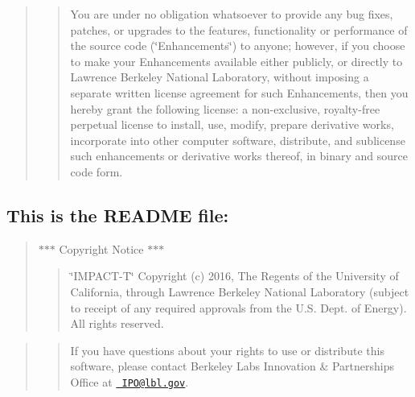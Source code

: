 \begin{quote}
\begin{quote}
You are under no obligation whatsoever to provide any bug fixes, patches, or upgrades to the features, functionality or performance of the source code (\char`\"{}\+Enhancements\char`\"{}) to anyone; however, if you choose to make your Enhancements available either publicly, or directly to Lawrence Berkeley National Laboratory, without imposing a separate written license agreement for such Enhancements, then you hereby grant the following license\+: a non-\/exclusive, royalty-\/free perpetual license to install, use, modify, prepare derivative works, incorporate into other computer software, distribute, and sublicense such enhancements or derivative works thereof, in binary and source code form. \end{quote}
\end{quote}


\subsection*{This is the R\+E\+A\+D\+ME file\+: }

\begin{quote}
$\ast$$\ast$$\ast$ Copyright Notice $\ast$$\ast$$\ast$ \begin{quote}
\char`\"{}\+I\+M\+P\+A\+C\+T-\/\+T\char`\"{} Copyright (c) 2016, The Regents of the University of California, through Lawrence Berkeley National Laboratory (subject to receipt of any required approvals from the U.\+S. Dept. of Energy). All rights reserved. \end{quote}
\end{quote}


\begin{quote}
\begin{quote}
If you have questions about your rights to use or distribute this software, please contact Berkeley Lab\textquotesingle{}s Innovation \& Partnerships Office at \href{mailto:IPO@lbl.gov}{\texttt{ I\+P\+O@lbl.\+gov}}. \end{quote}
\end{quote}


